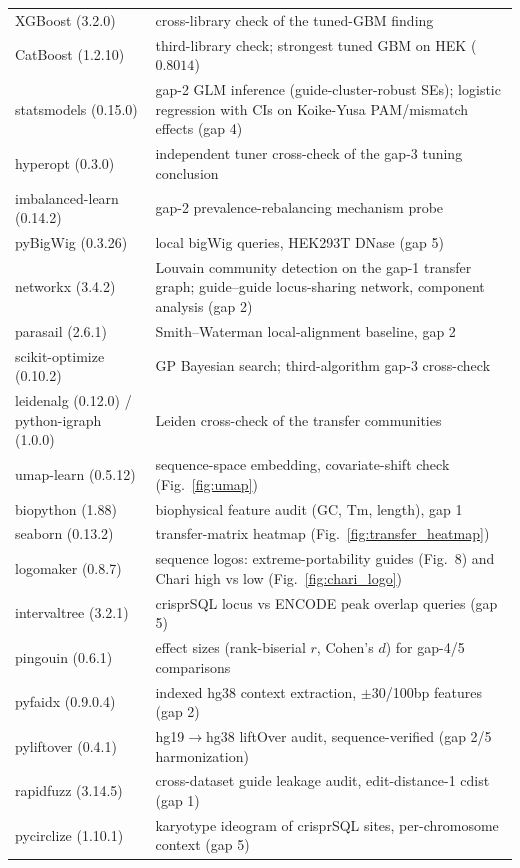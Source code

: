 \begin{longtable}{@{}p{}p{}@{}}
XGBoost (3.2.0) & cross-library check of the tuned-GBM finding \\
CatBoost (1.2.10) & third-library check; strongest tuned GBM on HEK ($0.8014$) \\
statsmodels (0.15.0) & gap-2 GLM inference (guide-cluster-robust SEs); logistic regression with CIs on Koike-Yusa PAM/mismatch effects (gap 4) \\
hyperopt (0.3.0) & independent tuner cross-check of the gap-3 tuning conclusion \\
imbalanced-learn (0.14.2) & gap-2 prevalence-rebalancing mechanism probe \\
pyBigWig (0.3.26) & local bigWig queries, HEK293T DNase (gap 5) \\
networkx (3.4.2) & Louvain community detection on the gap-1 transfer graph; guide--guide locus-sharing network, component analysis (gap 2) \\
parasail (2.6.1) & Smith--Waterman local-alignment baseline, gap 2 \\
scikit-optimize (0.10.2) & GP Bayesian search; third-algorithm gap-3 cross-check \\
leidenalg (0.12.0) / python-igraph (1.0.0) & Leiden cross-check of the transfer communities \\
umap-learn (0.5.12) & sequence-space embedding, covariate-shift check (Fig.~\ref{fig:umap}) \\
biopython (1.88) & biophysical feature audit (GC, Tm, length), gap 1 \\
seaborn (0.13.2) & transfer-matrix heatmap (Fig.~\ref{fig:transfer_heatmap}) \\
logomaker (0.8.7) & sequence logos: extreme-portability guides (Fig.~8) and Chari high vs low (Fig.~\ref{fig:chari_logo}) \\
intervaltree (3.2.1) & crisprSQL locus vs ENCODE peak overlap queries (gap 5) \\
pingouin (0.6.1) & effect sizes (rank-biserial $r$, Cohen's $d$) for gap-4/5 comparisons \\
pyfaidx (0.9.0.4) & indexed hg38 context extraction, $\pm$30/100bp features (gap 2) \\
pyliftover (0.4.1) & hg19$\to$hg38 liftOver audit, sequence-verified (gap 2/5 harmonization) \\
rapidfuzz (3.14.5) & cross-dataset guide leakage audit, edit-distance-1 cdist (gap 1) \\
pycirclize (1.10.1) & karyotype ideogram of crisprSQL sites, per-chromosome context (gap 5) \\

\end{longtable}
